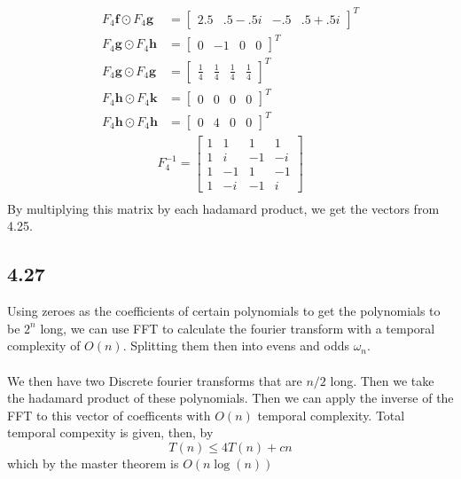 \documentclass[letterpaper,12pt]{article}
\theoremstyle{definition}
\begin{document}
\begin{align*}
    F_4\textbf{f} \odot F_4\textbf{g} &= \begin{bmatrix} 2.5 & .5-.5i & -.5 & .5+.5i \end{bmatrix}^T \\
    F_4\textbf{g} \odot F_4\textbf{h} &= \begin{bmatrix} 0 & -1 & 0 & 0 \end{bmatrix}^T \\
    F_4\textbf{g} \odot F_4\textbf{g} &= \begin{bmatrix} \frac{1}{4} & \frac{1}{4} & \frac{1}{4} & \frac{1}{4} \end{bmatrix}^T \\
    F_4\textbf{h} \odot F_4\textbf{k} &= \begin{bmatrix} 0 & 0 & 0 & 0 \end{bmatrix}^T \\
    F_4\textbf{h} \odot F_4\textbf{h} &= \begin{bmatrix} 0 & 4 & 0 & 0 \end{bmatrix}^T 
\end{align*}
\begin{align*}
F_4^{-1} =
\begin{bmatrix}
    1 & 1 & 1 & 1 \\
    1 & i & -1 & -i \\
    1 & -1 & 1 & -1 \\
    1 & -i & -1 & i
\end{bmatrix}\\
\end{align*}
By multiplying this matrix by each hadamard product, we get the vectors from 4.25.

\subsection*{4.27}

Using zeroes as the coefficients of certain polynomials to get the polynomials to be $2^n$ long, we can use 
FFT to calculate the fourier transform with a temporal complexity of $O(n)$.
Splitting them then into evens and odds $\omega_n$.\\\\
We then have two Discrete fourier transforms that are $n/2$ long. Then we take the hadamard product of these polynomials.
Then we can apply the inverse of the FFT to this vector of coefficents with $O(n)$ temporal complexity. Total temporal compexity is given, then, by
\[T(n) \leq 4T(n) + cn\]
which by the master theorem is $O(n \log(n))$
\end{document}
